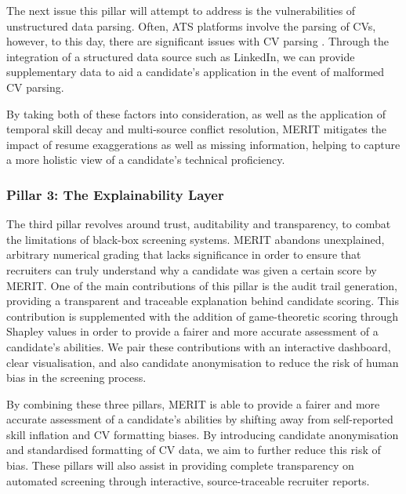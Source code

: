 The next issue this pillar will attempt to address is the vulnerabilities of unstructured data parsing. Often, ATS platforms
involve the parsing of CVs, however, to this day, there are significant issues with CV parsing \cite{emnlp2025resumebench}. Through the 
integration of a structured data source such as LinkedIn, we can provide supplementary data to aid a candidate's application in the 
event of malformed CV parsing.

By taking both of these factors into consideration, as well as the application of temporal skill decay and multi-source conflict
resolution, MERIT mitigates the impact of resume exaggerations as well as missing information, helping to capture a more holistic
view of a candidate's technical proficiency.

\subsubsection{Pillar 3: The Explainability Layer}
The third pillar revolves around trust, auditability and transparency, to combat the limitations of black-box screening systems.
MERIT abandons unexplained, arbitrary numerical grading that lacks significance in order to ensure that recruiters can truly
understand why a candidate was given a certain score by MERIT. One of the main contributions of this pillar is the audit trail
generation, providing a transparent and traceable explanation behind candidate scoring. This contribution is supplemented with
the addition of game-theoretic scoring through Shapley values in order to provide a fairer and more accurate assessment of a candidate's abilities.
We pair these contributions with an interactive dashboard, clear visualisation, and also candidate anonymisation to reduce the risk
of human bias in the screening process.

By combining these three pillars, MERIT is able to provide a fairer and more accurate assessment of a candidate's abilities
by shifting away from self-reported skill inflation and CV formatting biases. By introducing candidate anonymisation and
standardised formatting of CV data, we aim to further reduce this risk of bias. These pillars will also
assist in providing complete transparency on automated screening through interactive, source-traceable recruiter reports.


